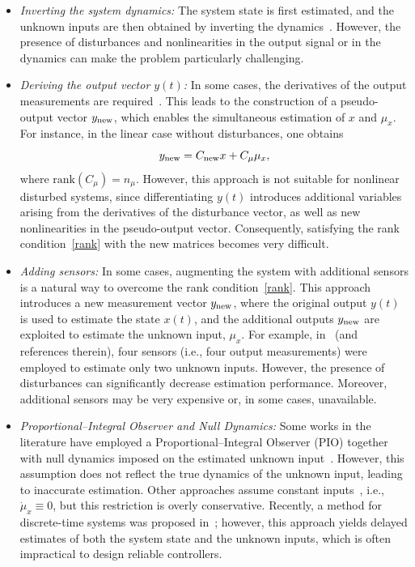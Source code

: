 \begin{itemize}
\item {\it Inverting the system dynamics:} The system state is first estimated, and the unknown inputs are then obtained by inverting the dynamics~\cite{Phanomchoeng:ASME/TM14,Benallouch:TCST17,Marquez:Auto14}. However, the presence of disturbances and nonlinearities in the output signal or in the dynamics can make the problem particularly challenging.
%



\item {\it Deriving the output vector $y(t)$:} In some cases, the derivatives of the output measurements are required~\cite{Hou:256351,Phanomchoeng:ASME/TM14}. This leads to the construction of a pseudo-output vector $y_{\rm new}$, which enables the simultaneous estimation of $x$ and $\mu_{x}$. For instance, in the linear case without disturbances, one obtains 
$$
y_{\rm new} = C_{\rm new} x + C_{\mu}\mu_{x},
$$
where $\mathrm{rank}(C_{\mu}) = n_{\mu}$. However, this approach is not suitable for nonlinear disturbed systems, since differentiating $y(t)$ introduces additional variables arising from the derivatives of the disturbance vector, as well as new nonlinearities in the pseudo-output vector. Consequently, satisfying the rank condition~\eqref{rank} with the new matrices becomes very difficult.

%
\item {\it Adding sensors:} In some cases, augmenting the system with additional sensors is a natural way to overcome the rank condition~\eqref{rank}. This approach introduces a new measurement vector $y_{\rm new}$, where the original output $y(t)$ is used to estimate the state $x(t)$, and the additional outputs $y_{\rm new}$ are exploited to estimate the unknown input, $\mu_{x}$. For example, in~\cite{Phanomchoeng:ASME/TM14} (and references therein), four sensors (i.e., four output measurements) were employed to estimate only two unknown inputs. However, the presence of disturbances can significantly decrease estimation performance. Moreover, additional sensors may be very expensive or, in some cases, unavailable.
%
\item {\it Proportional--Integral Observer and Null Dynamics:} Some works in the literature have employed a Proportional--Integral Observer (PIO) together with null dynamics imposed on the estimated unknown input~\cite{PIO_1995}. However, this assumption does not reflect the true dynamics of the unknown input, leading to inaccurate estimation. Other approaches assume constant inputs~\cite{jeon2020simultaneous}, i.e., $\dot{\mu}_{x} \equiv 0$, but this restriction is overly conservative. Recently, a method for discrete-time systems was proposed in~\cite{nguyen2024cyberattack}; however, this approach yields delayed estimates of both the system state and the unknown inputs, which is often impractical to design reliable controllers.
\end{itemize}

